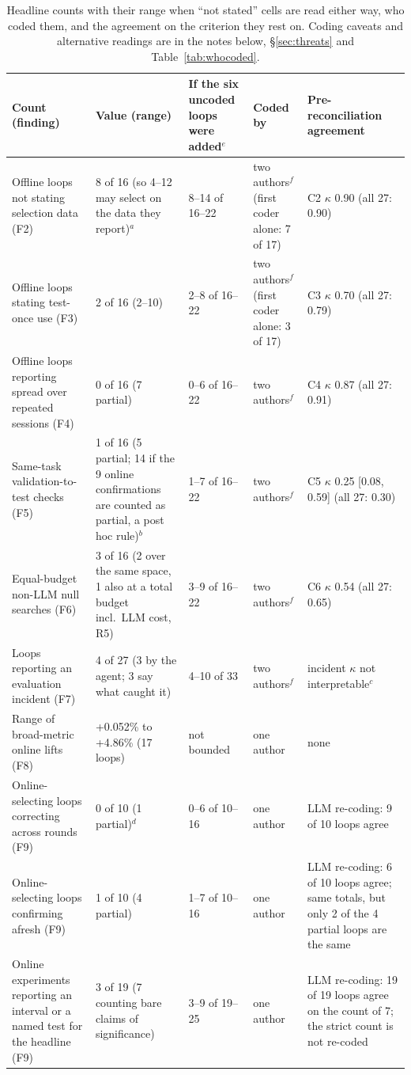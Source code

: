\documentclass[sigconf,nonacm]{acmart}
\begin{document}
\begin{table}[t]
\caption{Headline counts with their range when ``not stated'' cells are read either way, who coded them, and the agreement on the criterion they rest on. Coding caveats and alternative readings are in the notes below, \S\ref{sec:threats} and Table~\ref{tab:whocoded}.}\label{tab:headline}
\centering\footnotesize
\begin{tabularx}{\textwidth}{@{}Xp{3.9cm}p{2.2cm}p{1.6cm}p{2.9cm}@{}}
\toprule
Count (finding) & Value (range) & If the six uncoded loops were added$^e$ & Coded by & Pre-reconciliation agreement \\
\midrule
Offline loops not stating selection data (F2) & 8 of 16 (so 4--12 may select on the data they report)$^a$ & 8--14 of 16--22 & two authors$^f$ (first coder alone: 7 of 17) & C2 $\kappa$ 0.90 (all 27: 0.90) \\
Offline loops stating test-once use (F3) & 2 of 16 (2--10) & 2--8 of 16--22 & two authors$^f$ (first coder alone: 3 of 17) & C3 $\kappa$ 0.70 (all 27: 0.79) \\
Offline loops reporting spread over repeated sessions (F4) & 0 of 16 (7 partial) & 0--6 of 16--22 & two authors$^f$ & C4 $\kappa$ 0.87 (all 27: 0.91) \\
Same-task validation-to-test checks (F5) & 1 of 16 (5 partial; 14 if the 9 online confirmations are counted as partial, a post hoc rule)$^b$ & 1--7 of 16--22 & two authors$^f$ & C5 $\kappa$ 0.25 [0.08, 0.59] (all 27: 0.30) \\
Equal-budget non-LLM null searches (F6) & 3 of 16 (2 over the same space, 1 also at a total budget incl.\ LLM cost, R5) & 3--9 of 16--22 & two authors$^f$ & C6 $\kappa$ 0.54 (all 27: 0.65) \\
Loops reporting an evaluation incident (F7) & 4 of 27 (3 by the agent; 3 say what caught it) & 4--10 of 33 & two authors$^f$ & incident $\kappa$ not interpretable$^c$ \\
Range of broad-metric online lifts (F8) & +0.052\% to +4.86\% (17 loops) & not bounded & one author & none \\
Online-selecting loops correcting across rounds (F9) & 0 of 10 (1 partial)$^d$ & 0--6 of 10--16 & one author & LLM re-coding: 9 of 10 loops agree \\
Online-selecting loops confirming afresh (F9) & 1 of 10 (4 partial) & 1--7 of 10--16 & one author & LLM re-coding: 6 of 10 loops agree; same totals, but only 2 of the 4 partial loops are the same \\
Online experiments reporting an interval or a named test for the headline (F9) & 3 of 19 (7 counting bare claims of significance) & 3--9 of 19--25 & one author & LLM re-coding: 19 of 19 loops agree on the count of 7; the strict count is not re-coded \\
\bottomrule
\end{tabularx}


\end{table}
\end{document}
